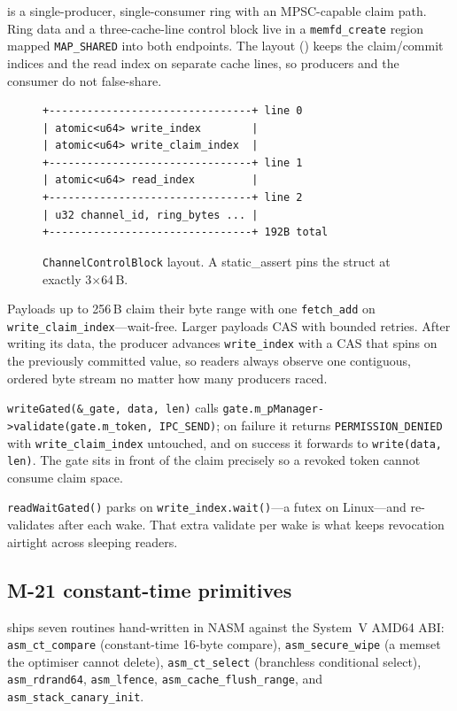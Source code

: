 \Mthree is a single-producer, single-consumer ring with an
MPSC-capable claim path. Ring data and a three-cache-line control
block live in a \texttt{memfd\_create} region mapped
\texttt{MAP\_SHARED} into both endpoints. The layout
() keeps the claim/commit indices and the read index on
separate cache lines, so producers and the consumer do not
false-share.

\begin{figure}[t]
\centering\small
\begin{verbatim}
+--------------------------------+ line 0
| atomic<u64> write_index        |
| atomic<u64> write_claim_index  |
+--------------------------------+ line 1
| atomic<u64> read_index         |
+--------------------------------+ line 2
| u32 channel_id, ring_bytes ... |
+--------------------------------+ 192B total
\end{verbatim}
\caption{\texttt{ChannelControlBlock} layout. A static\_assert pins
the struct at exactly 3$\times$64\,B.}
\label{fig:cb}
\end{figure}

Payloads up to 256\,B claim their byte range with one
\texttt{fetch\_add} on \texttt{write\_claim\_index}---wait-free.
Larger payloads CAS with bounded retries. After writing its data, the
producer advances \texttt{write\_index} with a CAS that spins on the
previously committed value, so readers always observe one contiguous,
ordered byte stream no matter how many producers raced.

\texttt{writeGated(\&\_gate, data, len)} calls
\texttt{gate.m\_pManager->validate(gate.m\_token, IPC\_SEND)}; on
failure it returns \texttt{PERMISSION\_DENIED} with
\texttt{write\_claim\_index} untouched, and on success it forwards to
\texttt{write(data, len)}. The gate sits in front of the claim
precisely so a revoked token cannot consume claim space.

\texttt{readWaitGated()} parks on \texttt{write\_index.wait()}---a
futex on Linux---and re-validates after each wake. That extra
validate per wake is what keeps revocation airtight across sleeping
readers.

\subsection{M-21 constant-time primitives}
\label{sec:impl:asm}

\Mtwentyone ships seven routines hand-written in NASM against the
System~V AMD64 ABI: \texttt{asm\_ct\_compare} (constant-time 16-byte
compare), \texttt{asm\_secure\_wipe} (a memset the optimiser cannot
delete), \texttt{asm\_ct\_select} (branchless conditional select),
\texttt{asm\_rdrand64}, \texttt{asm\_lfence},
\texttt{asm\_cache\_flush\_range}, and
\texttt{asm\_stack\_canary\_init}.

